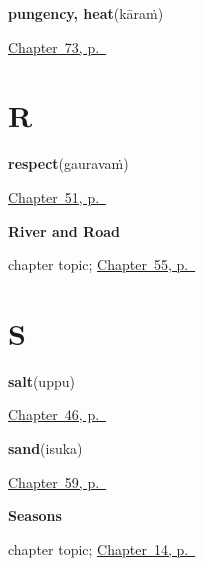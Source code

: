 \noindent\begin{minipage}[t]{\linewidth}
\raggedright
\textbf{pungency, heat}\enspace\emph{}\enspace(kāraṁ)\par
\footnotesize \hyperref[ch:te-tastes]{Chapter~73, p.~\pageref*{ch:te-tastes}}
\end{minipage}\par\smallskip

\section*{R}

\noindent\begin{minipage}[t]{\linewidth}
\raggedright
\textbf{respect}\enspace\emph{}\enspace(gauravaṁ)\par
\footnotesize \hyperref[ch:te-courtesy]{Chapter~51, p.~\pageref*{ch:te-courtesy}}
\end{minipage}\par\smallskip

\noindent\begin{minipage}[t]{\linewidth}
\raggedright
\textbf{River and Road}\par
\footnotesize chapter topic; \hyperref[ch:te-river-road]{Chapter~55, p.~\pageref*{ch:te-river-road}}
\end{minipage}\par\smallskip

\section*{S}

\noindent\begin{minipage}[t]{\linewidth}
\raggedright
\textbf{salt}\enspace\emph{}\enspace(uppu)\par
\footnotesize \hyperref[ch:te-ask-for]{Chapter~46, p.~\pageref*{ch:te-ask-for}}
\end{minipage}\par\smallskip

\noindent\begin{minipage}[t]{\linewidth}
\raggedright
\textbf{sand}\enspace\emph{}\enspace(isuka)\par
\footnotesize \hyperref[ch:te-weather-ground]{Chapter~59, p.~\pageref*{ch:te-weather-ground}}
\end{minipage}\par\smallskip

\noindent\begin{minipage}[t]{\linewidth}
\raggedright
\textbf{Seasons}\par
\footnotesize chapter topic; \hyperref[ch:te-seasons]{Chapter~14, p.~\pageref*{ch:te-seasons}}
\end{minipage}\par\smallskip

